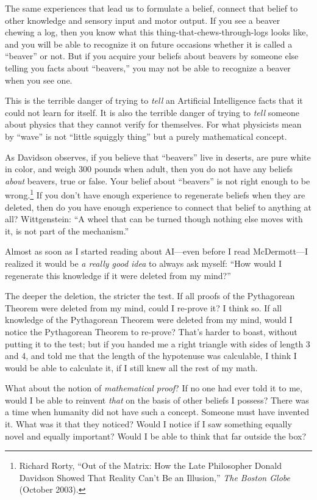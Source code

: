 {
 The same experiences that lead us to formulate a belief, connect
that belief to other knowledge and sensory input and motor output. If
you see a beaver chewing a log, then you know what this
thing-that-chews-through-logs looks like, and you will be able to
recognize it on future occasions whether it is called a
``beaver'' or not. But if you
acquire your beliefs about beavers by someone else telling you facts
about ``beavers,'' you may not be
able to recognize a beaver when you see one.}

{
 This is the terrible danger of trying to \textit{tell} an
Artificial Intelligence facts that it could not learn for itself. It is
also the terrible danger of trying to \textit{tell} someone about
physics that they cannot verify for themselves. For what physicists
mean by ``wave'' is not
``little squiggly thing'' but a
purely mathematical concept.}

{
 As Davidson observes, if you believe that
``beavers'' live in deserts, are
pure white in color, and weigh 300 pounds when adult, then you do not
have any beliefs \textit{about} beavers, true or false. Your belief
about ``beavers'' is not right
enough to be wrong.\footnote{Richard Rorty, ``Out of the Matrix: How the
Late Philosopher Donald Davidson Showed That Reality
Can't Be an Illusion,'' \textit{The
Boston Globe} (October 2003).} If you don't
have enough experience to regenerate beliefs when they are deleted,
then do you have enough experience to connect that belief to anything
at all? Wittgenstein: ``A wheel that can be turned
though nothing else moves with it, is not part of the
mechanism.''}

{
 Almost as soon as I started reading about AI---even before I read
McDermott---I realized it would be \textit{a really good idea} to
always ask myself: ``How would I regenerate this
knowledge if it were deleted from my mind?''}

{
 The deeper the deletion, the stricter the test. If all proofs of
the Pythagorean Theorem were deleted from my mind, could I re-prove it?
I think so. If all knowledge of the Pythagorean Theorem were deleted
from my mind, would I notice the Pythagorean Theorem to re-prove?
That's harder to boast, without putting it to the test;
but if you handed me a right triangle with sides of length 3 and 4, and
told me that the length of the hypotenuse was calculable, I think I
would be able to calculate it, if I still knew all the rest of my
math.}

{
 What about the notion of \textit{mathematical proof}? If no one
had ever told it to me, would I be able to reinvent \textit{that} on
the basis of other beliefs I possess? There was a time when humanity
did not have such a concept. Someone must have invented it. What was it
that they noticed? Would I notice if I saw something equally novel and
equally important? Would I be able to think that far outside the box?}

